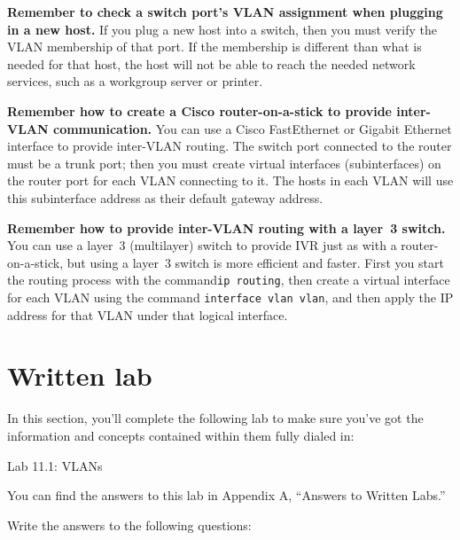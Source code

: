 \textbf{Remember to check a switch port's VLAN assignment when plugging
in a new host.} If you plug a new host into a switch, then you must
verify the VLAN membership of that port. If the membership is different
than what is needed for that host, the host will not be able to reach
the needed network services, such as a workgroup server or printer.

\textbf{Remember how to create a Cisco router-on-a-stick to provide
inter-VLAN communication.} You can use a Cisco FastEthernet or Gigabit
Ethernet interface to provide inter-VLAN routing. The switch port
connected to the router must be a trunk port; then you must create
virtual interfaces
(subinterfaces) on the router port for each VLAN connecting to it. The
hosts in each VLAN will use this subinterface address as their default
gateway address.

\textbf{Remember how to provide inter-VLAN routing with a layer~3
switch.} You can use a layer~3 (multilayer) switch to provide IVR just
as with a router-on-a-stick, but using a layer~3 switch is more
efficient and faster. First you start the routing process with the
command\texttt{ip\ routing}, then create a virtual interface for each
VLAN using the command \texttt{interface\ vlan\ vlan}, and then apply
the IP address for that VLAN under that logical interface.

\section{Written lab}

In this section, you'll complete the following lab to make sure you've
got the information and concepts contained within them fully dialed in:

Lab 11.1: VLANs

You can find the answers to this lab in Appendix A, ``Answers to Written
Labs.''

Write the answers to the following questions:

